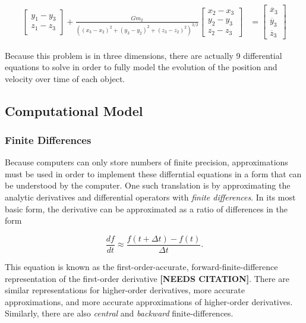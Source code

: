 \documentclass{report}
\begin{document}
\begin{align}
\begin{bmatrix}
                    y_1 - y_3 \\
                    z_1 - z_3
                \end{bmatrix} + 
                \frac{G m_2}{((x_3 - x_2)^2 + (y_3 - y_2)^2 + (z_3 - z_2)^2)^{3/2}} 
                \begin{bmatrix}
                    x_2 - x_3 \\
                    y_2 - y_3 \\
                    z_2 - z_3
                \end{bmatrix} &= \begin{bmatrix}
                    \ddot{x_3} \\
                    \ddot{y_3} \\ 
                    \ddot{z_3}
                \end{bmatrix}
            \end{align}

            Because this problem is in three dimensions, there are actually 9 differential equations to solve in order to fully model the evolution of the position and velocity over time of each object.

        \subsection{Computational Model}
        
            \subsubsection{Finite Differences}

                Because computers can only store numbers of finite precision, approximations must be used in order to implement these differntial equations in a form that can be understood by the computer.  One such translation is by approximating the analytic derivatives and differential operators with \emph{finite differences}. In its most basic form, the derivative can be approximated as a ratio of differences in the form

                \begin{equation}
                    \frac{df}{dt} \approx \frac{f(t + \Delta t) - f(t)}{\Delta t}.
                \end{equation}

                This equation is known as the first-order-accurate, forward-finite-difference representation of the first-order derivative \textbf{[NEEDS CITATION]}.  There are similar representations for higher-order derivatives, more accurate approximations, and more accurate approximations of higher-order derivatives. Similarly, there are also \emph{central} and \emph{backward} finite-differences.
\end{document}
